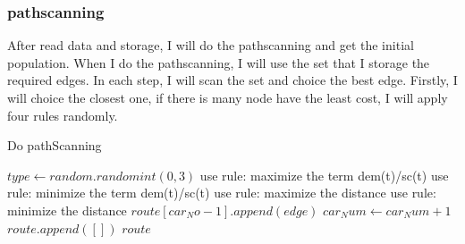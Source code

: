 \documentclass[conference,compsoc]{IEEEtran}
\begin{document}
    \subsubsection{pathscanning}
      After read data and storage, I will do the pathscanning and get the initial population.
      When I do the pathscanning, I will use the set that I storage the required edges. 
      In each step, I will scan the set and choice the best edge. Firstly, I will choice the closest one, if there is many node have the least cost, I will apply four rules randomly.
      \begin{algorithm}
        \caption{Do pathScanning}
        \begin{algorithmic}[1]
                \State $type \gets random.randomint(0,3)$
                  \State use rule: maximize the term dem(t)/sc(t)
                  \State use rule: minimize the term dem(t)/sc(t)
                  \State use rule: maximize the distance
                  \State use rule: minimize the distance
                \EndIf
              \EndFor
                \State $route[car_No-1].append(edge)$
              \Else
                \State $car_Num\gets car_Num +1$
                \State $route.append([])$
              \EndIf
            \EndWhile
            \State\Return $route$
          \EndFunction
        \end{algorithmic}
      \end{algorithm}
\end{document}
